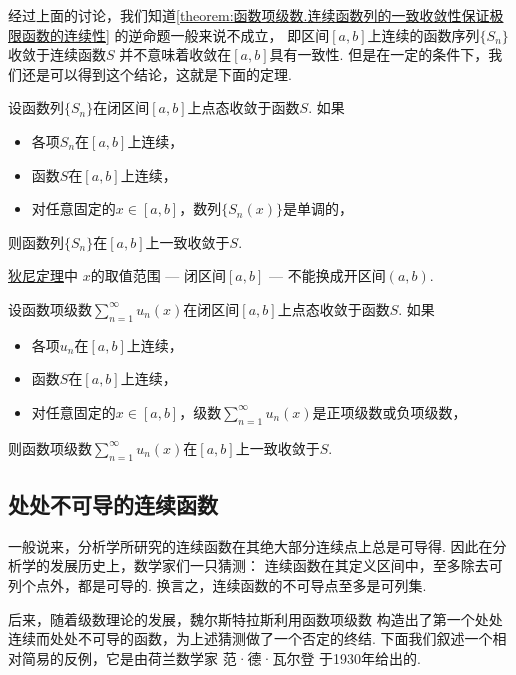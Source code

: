 经过上面的讨论，我们知道\cref{theorem:函数项级数.连续函数列的一致收敛性保证极限函数的连续性}
的逆命题一般来说不成立，
即区间\([a,b]\)上连续的函数序列\(\{S_n\}\)收敛于连续函数\(S\)
并不意味着收敛在\([a,b]\)具有一致性.
但是在一定的条件下，我们还是可以得到这个结论，这就是下面的定理.
\begin{theorem}[狄尼定理]\label{theorem:函数项级数.狄尼定理}
设函数列\(\{S_n\}\)在闭区间\([a,b]\)上点态收敛于函数\(S\).
如果\begin{itemize}
	\item 各项\(S_n\)在\([a,b]\)上连续，
	\item 函数\(S\)在\([a,b]\)上连续，
	\item 对任意固定的\(x\in[a,b]\)，数列\(\{S_n(x)\}\)是单调的，
\end{itemize}
则函数列\(\{S_n\}\)在\([a,b]\)上一致收敛于\(S\).
\end{theorem}
\begin{remark}
\hyperref[theorem:函数项级数.狄尼定理]{狄尼定理}中
\(x\)的取值范围 --- 闭区间\([a,b]\) --- 不能换成开区间\((a,b)\).
\end{remark}
\begin{theorem}
设函数项级数\(\sum_{n=1}^\infty u_n(x)\)在闭区间\([a,b]\)上点态收敛于函数\(S\).
如果\begin{itemize}
	\item 各项\(u_n\)在\([a,b]\)上连续，
	\item 函数\(S\)在\([a,b]\)上连续，
	\item 对任意固定的\(x\in[a,b]\)，级数\(\sum_{n=1}^\infty u_n(x)\)是正项级数或负项级数，
\end{itemize}
则函数项级数\(\sum_{n=1}^\infty u_n(x)\)在\([a,b]\)上一致收敛于\(S\).
\end{theorem}

\subsection{处处不可导的连续函数}
一般说来，分析学所研究的连续函数在其绝大部分连续点上总是可导得.
因此在分析学的发展历史上，数学家们一只猜测：
连续函数在其定义区间中，至多除去可列个点外，都是可导的.
换言之，连续函数的不可导点至多是可列集.

后来，随着级数理论的发展，魏尔斯特拉斯利用函数项级数
构造出了第一个处处连续而处处不可导的函数，为上述猜测做了一个否定的终结.
下面我们叙述一个相对简易的反例，它是由荷兰数学家 范·德·瓦尔登 于1930年给出的.

